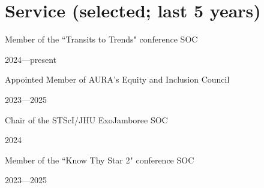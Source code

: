 \documentclass[12pt, a4paper]{article} %
\begin{document}
\section*{Service (selected; last 5 years)}

\begin{minipage}[t]{0.7\textwidth}
\begin{flushleft}%
  \setlength{\leftskip}{0.2cm}%
Member of the ``Transits to Trends" conference SOC
\end{flushleft}
\end{minipage}
\begin{minipage}[t]{0.3\textwidth}
\hfill 2024---present
\end{minipage}

\vspace{0.3cm}

\begin{minipage}[t]{0.7\textwidth}
\begin{flushleft}%
  \setlength{\leftskip}{0.2cm}%
Appointed Member of AURA's Equity and Inclusion Council 
\end{flushleft}
\end{minipage}
\begin{minipage}[t]{0.3\textwidth}
\hfill 2023---2025
\end{minipage}

\vspace{0.3cm}

\begin{minipage}[t]{0.7\textwidth}
\begin{flushleft}%
  \setlength{\leftskip}{0.2cm}%
Chair of the STScI/JHU ExoJamboree SOC
\end{flushleft}
\end{minipage}
\begin{minipage}[t]{0.3\textwidth}
\hfill 2024
\end{minipage}

\vspace{0.3cm}

\begin{minipage}[t]{0.7\textwidth}
\begin{flushleft}%
  \setlength{\leftskip}{0.2cm}%
Member of the ``Know Thy Star 2" conference SOC
\end{flushleft}
\end{minipage}
\begin{minipage}[t]{0.3\textwidth}
\hfill 2023---2025
\end{minipage}

\vspace{0.3cm}
\end{document}
